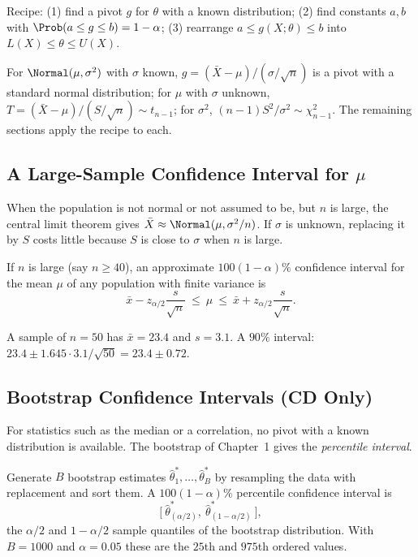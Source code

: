 Recipe: (1) find a pivot $g$ for $\theta$ with a known distribution; (2) find constants $a,b$ with $\Prob(a\le g\le b)=1-\alpha$; (3) rearrange $a\le g(X;\theta)\le b$ into $L(X)\le\theta\le U(X)$.

\begin{example}
For $\Normal(\mu,\sigma^2)$ with $\sigma$ known, $g=(\bar{X}-\mu)/(\sigma/\sqrt n)$ is a pivot with a standard normal distribution; for $\mu$ with $\sigma$ unknown, $T=(\bar{X}-\mu)/(S/\sqrt n)\sim t_{n-1}$; for $\sigma^2$, $(n-1)S^2/\sigma^2\sim\chi^2_{n-1}$. The remaining sections apply the recipe to each.
\end{example}

\subsection{A Large-Sample Confidence Interval for $\mu$}

When the population is not normal or not assumed to be, but $n$ is large, the central limit theorem gives $\bar{X}\approx\Normal(\mu,\sigma^2/n)$. If $\sigma$ is unknown, replacing it by $S$ costs little because $S$ is close to $\sigma$ when $n$ is large.

\begin{theorem}\label{thm:largesample}
If $n$ is large (say $n\ge40$), an approximate $100(1-\alpha)\%$ confidence interval for the mean $\mu$ of any population with finite variance is
\[ \bar{x}-z_{\alpha/2}\frac{s}{\sqrt n}\ \le\ \mu\ \le\ \bar{x}+z_{\alpha/2}\frac s{\sqrt n}. \]
\end{theorem}

\begin{example}
A sample of $n=50$ has $\bar{x}=23.4$ and $s=3.1$. A $90\%$ interval: $23.4\pm1.645\cdot3.1/\sqrt{50}=23.4\pm0.72$.
\end{example}

\subsection{Bootstrap Confidence Intervals (CD Only)}

For statistics such as the median or a correlation, no pivot with a known distribution is available. The bootstrap of Chapter~1 gives the \emph{percentile interval}.

\begin{definition}
Generate $B$ bootstrap estimates $\hat\theta^*_1,\dots,\hat\theta^*_B$ by resampling the data with replacement and sort them. A $100(1-\alpha)\%$ percentile confidence interval is
\[ \big[\ \hat\theta^*_{(\alpha/2)},\ \hat\theta^*_{(1-\alpha/2)}\ \big], \]
the $\alpha/2$ and $1-\alpha/2$ sample quantiles of the bootstrap distribution. With $B=1000$ and $\alpha=0.05$ these are the $25$th and $975$th ordered values.
\end{definition}

